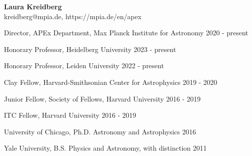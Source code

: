 \documentclass[12pt,letterpaper]{article}
\begin{document}
\thispagestyle{empty}\sloppy\sloppypar\raggedbottom

\textbf{\Large Laura Kreidberg}\\ 
\textsf{\small kreidberg@mpia.de, https://mpia.de/en/apex} \\[0.5ex]

\begin{list}{}{\cvlist}

    \item Director, APEx Department, Max Planck Institute for Astronomy \hfill 2020 - present \\
    \item Honorary Professor, Heidelberg University \hfill 2023 - present \\
    \item Honorary Professor, Leiden University \hfill 2022 - present \\
    \item Clay Fellow, Harvard-Smithsonian Center for Astrophysics \hfill 2019 - 2020\\
    \item Junior Fellow, Society of Fellows, Harvard University \hfill 2016 - 2019\\
    \item ITC Fellow, Harvard University \hfill 2016 - 2019\\

\end{list}


\begin{list}{}{\cvlist}
    \item University of Chicago, Ph.D. Astronomy and Astrophysics \hfill 2016
    \item Yale University, B.S. Physics and Astronomy, with distinction \hfill 2011
\end{list}
\end{document}
